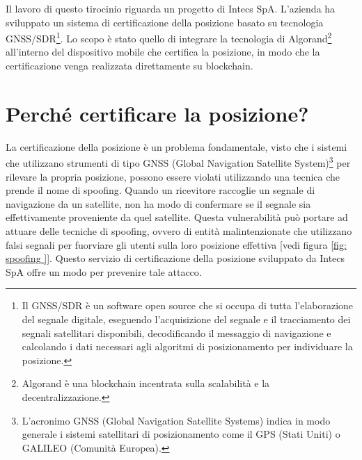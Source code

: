 Il lavoro di questo tirocinio riguarda un progetto di Intecs SpA. L'azienda ha sviluppato un sistema di certificazione della posizione basato su tecnologia GNSS/SDR\footnote{Il GNSS/SDR è un software open source che si occupa di tutta l'elaborazione del segnale digitale, eseguendo l'acquisizione del segnale e il tracciamento dei segnali satellitari disponibili, decodificando il messaggio di navigazione e calcolando i dati necessari agli algoritmi di posizionamento per individuare la posizione.}. Lo scopo è stato quello di integrare la tecnologia di Algorand\footnote{Algorand è una blockchain incentrata sulla scalabilità e la decentralizzazione.} all’interno del dispositivo mobile che certifica la posizione, in modo che la certificazione venga realizzata direttamente su blockchain.

\section{Perché certificare la posizione?}
La certificazione della posizione è un problema fondamentale, visto che i sistemi che utilizzano strumenti di tipo GNSS (Global Navigation Satellite System)\footnote{L'acronimo GNSS (Global Navigation Satellite Systems) indica in modo generale i sistemi satellitari di posizionamento come il GPS (Stati Uniti) o GALILEO (Comunità Europea).} per rilevare la propria posizione, possono essere violati utilizzando una tecnica che prende il nome di spoofing. Quando un ricevitore raccoglie un segnale di navigazione da un satellite, non ha modo di confermare se il segnale sia effettivamente proveniente da quel satellite. Questa vulnerabilità può portare ad attuare delle tecniche di spoofing, ovvero di entità malintenzionate che utilizzano falsi segnali per fuorviare gli utenti sulla loro posizione effettiva [vedi figura \ref{fig: spoofing }]. Questo servizio di certificazione della posizione sviluppato da Intecs SpA offre un modo per prevenire tale attacco\cite{spoofing}.
